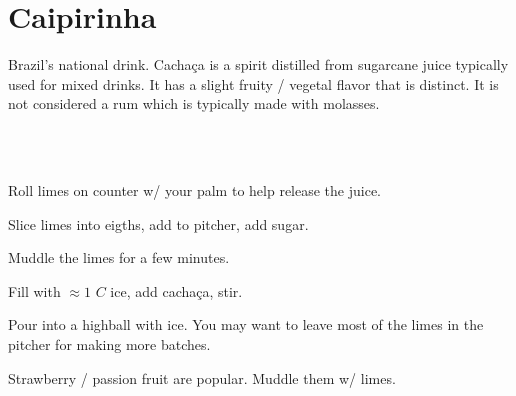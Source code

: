 \section[Caipirinha]{Caipirinha}


\begin{recipestats}[
	servings=2,
	preptime=5 \minute,
	source=Kevin \& Marina,
]
\end{recipestats}


\begin{recipeabstract}
	Brazil's national drink.
	Cacha\c{c}a is a spirit distilled from sugarcane juice typically used for mixed drinks.
	It has a slight fruity / vegetal flavor that is distinct.
	It is not considered a rum which is typically made with molasses.
\end{recipeabstract}


\begin{ingredientcolumns}[1]
	\begin{ingredientblock}
		\\
		\\
	\end{ingredientblock}
\end{ingredientcolumns}


\begin{preparation}
\item Roll limes on counter w/ your palm to help release the juice.

\item Slice limes into eigths, add to pitcher, add sugar.

\item Muddle the limes for a few minutes.

\item Fill with $\approx 1$ $C$ ice, add cacha\c{c}a, stir.

\item Pour into a highball with ice.
	You may want to leave most of the limes in the pitcher for making more batches.
\end{preparation}


\begin{variation}
\item Strawberry / passion fruit are popular.
	Muddle them w/ limes.
\end{variation}


\recipeend%
